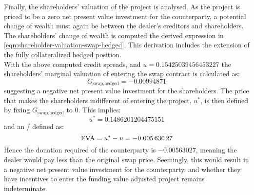 \documentclass[main.tex]{subfiles}
\begin{document}
            Finally, the shareholders' valuation of the project is analysed.
            As the project is priced to be a zero net present value investment for the counterparty,
            a potential change of wealth must again be between the dealer's creditors and shareholders.
            The shareholders' change of wealth is computed the derived expression in \cref{eqn:shareholder-valuation-swap-hedged}.
            This derivation includes the extension of the fully collateralized hedged position.
            \\
            With the above computed credit spreads, and $u=\num{0.15425039456453227}$
            the shareholders' marginal valuation of entering the swap contract is calculated as:
            \begin{equation}
                G_{\text{swap,hedged}} = \num{-0.00994871}
            \end{equation}
            suggesting a negative net present value investment for the shareholders. 
            The price that makes the shareholders indifferent of entering the project, $u^{\ast}$, is then defined by fixing $G_{\text{swap,hedged}}$ to 0.
            This implies:
            \begin{equation}
                u^{\ast} = \num{0.1486201204475151}
            \end{equation}
            and an \FVA/ defined as:
            \begin{equation}
                \FVA/ = u^{\ast} - u = \num{-0.00563027}
            \end{equation}
            Hence the donation required of the counterparty is \num{-0.00563027},
            meaning the dealer would pay less than the original swap price.
            Seemingly, this would result in a negative net present value investment for the counterparty,
            and whether they have incentives to enter the funding value adjusted project remains indeterminate.
            
\end{document}
